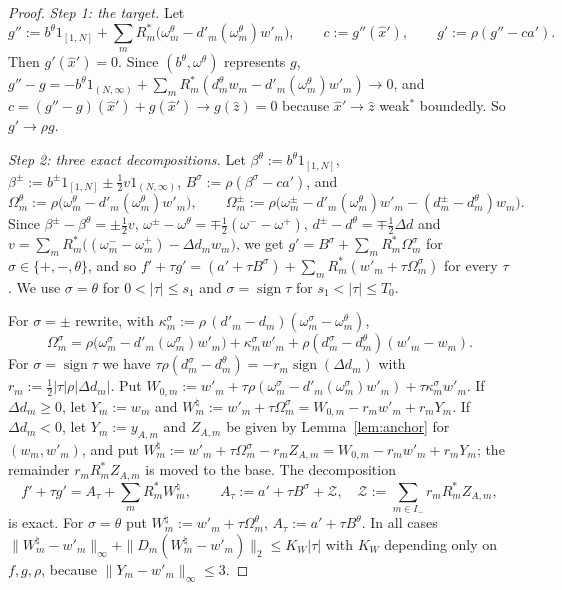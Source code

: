 \documentclass[10pt]{amsart}
\theoremstyle{definition}
\theoremstyle{remark}
\newcommand{\sgn}{\operatorname{sign}}
\newcommand{\zh}{\hat z}
\begin{document}
\begin{proof}
\emph{Step 1: the target.}  Let
\[
 g'':=b^\theta1_{[1,N]}+\sum_mR_m^*\big(\omega^\theta_m-d'_m(\omega^\theta_m)
 w'_m\big),\qquad c:=g''(\hat x'),\qquad g':=\rho(g''-ca').
\]
Then $g'(\hat x')=0$.  Since $(b^\theta,\omega^\theta)$ represents $g$,
$g''-g=-b^\theta1_{(N,\infty)}+\sum_mR_m^*(d^\theta_mw_m-d'_m(\omega^\theta_m)
w'_m)\to0$, and $c=(g''-g)(\hat x')+g(\hat x')\to g(\zh)=0$ because $\hat
x'\to\zh$ weak$^*$ boundedly.  So $g'\to\rho g$.

\emph{Step 2: three exact decompositions.}  Let
$\beta^\theta:=b^\theta1_{[1,N]}$, $\beta^\pm:=b^\pm1_{[1,N]}\pm\frac12v
1_{(N,\infty)}$, $B^\sigma:=\rho(\beta^\sigma-ca')$, and
\[
 \Omega^\theta_m:=\rho\big(\omega^\theta_m-d'_m(\omega^\theta_m)w'_m\big),\qquad
 \Omega^\pm_m:=\rho\big(\omega^\pm_m-d'_m(\omega^\theta_m)w'_m-(d^\pm_m-
 d^\theta_m)w_m\big).
\]
Since $\beta^\pm-\beta^\theta=\pm\frac12v$, $\omega^\pm-\omega^\theta=
\mp\frac12(\omega^--\omega^+)$, $d^\pm-d^\theta=\mp\frac12\Delta d$ and
$v=\sum_mR_m^*\big((\omega^-_m-\omega^+_m)-\Delta d_mw_m\big)$, we get
$g'=B^\sigma+\sum_mR^*_m\Omega^\sigma_m$ for $\sigma\in\{+,-,\theta\}$, and
so $f'+\tau g'=(a'+\tau B^\sigma)+\sum_mR^*_m(w'_m+\tau\Omega^\sigma_m)$ for
every $\tau$.  We use $\sigma=\theta$ for $0<|\tau|\le s_1$ and
$\sigma=\sgn\tau$ for $s_1<|\tau|\le T_0$.

For $\sigma=\pm$ rewrite, with $\kappa^\sigma_m:=\rho\,(d'_m-d_m)(\omega^\sigma_m
-\omega^\theta_m)$,
\[
 \Omega^\sigma_m=\rho\big(\omega^\sigma_m-d'_m(\omega^\sigma_m)w'_m\big)+
 \kappa^\sigma_mw'_m+\rho(d^\sigma_m-d^\theta_m)(w'_m-w_m).
\]
For $\sigma=\sgn\tau$ we have $\tau\rho(d^\sigma_m-d^\theta_m)=-r_m\sgn
(\Delta d_m)$ with $r_m:=\frac12|\tau|\rho|\Delta d_m|$.  Put
$W_{0,m}:=w'_m+\tau\rho(\omega^\sigma_m-d'_m(\omega^\sigma_m)w'_m)+
\tau\kappa^\sigma_mw'_m$.  If $\Delta d_m\ge0$, let $Y_m:=w_m$ and
$W^\natural_m:=w'_m+\tau\Omega^\sigma_m=W_{0,m}-r_mw'_m+r_mY_m$.  If
$\Delta d_m<0$, let $Y_m:=y_{A,m}$ and $Z_{A,m}$ be given by
Lemma~\ref{lem:anchor} for $(w_m,w'_m)$, and put $W^\natural_m:=w'_m+\tau
\Omega^\sigma_m-r_mZ_{A,m}=W_{0,m}-r_mw'_m+r_mY_m$; the remainder
$r_mR^*_mZ_{A,m}$ is moved to the base.  The decomposition
\[
 f'+\tau g'=A_\tau+\sum_mR^*_mW^\natural_m,\qquad A_\tau:=a'+\tau B^\sigma
 +\mathcal Z,\quad\mathcal Z:=\sum_{m\in I_-}r_mR^*_mZ_{A,m},
\]
is exact.  For $\sigma=\theta$ put $W^\natural_m:=w'_m+\tau\Omega^\theta_m$,
$A_\tau:=a'+\tau B^\theta$.  In all cases $\|W^\natural_m-w'_m\|_\infty+
\|D_m(W^\natural_m-w'_m)\|_2\le K_W|\tau|$ with $K_W$ depending only on
$f,g,\rho$, because $\|Y_m-w'_m\|_\infty\le3$.


\end{proof}
\end{document}
